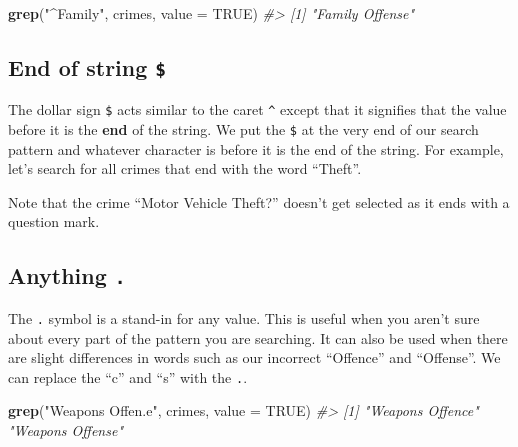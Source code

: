 \documentclass[
  12pt,
]{book}
\newenvironment{Shaded}{\begin{snugshade}}{\end{snugshade}}
\newcommand{\CommentTok}[1]{\textcolor[rgb]{0.37,0.37,0.37}{\textit{#1}}}
\newcommand{\DataTypeTok}[1]{\textcolor[rgb]{0.27,0.27,0.27}{#1}}
\newcommand{\KeywordTok}[1]{\textcolor[rgb]{0.27,0.27,0.27}{\textbf{#1}}}
\newcommand{\NormalTok}[1]{#1}
\newcommand{\OtherTok}[1]{\textcolor[rgb]{0.37,0.37,0.37}{#1}}
\newcommand{\StringTok}[1]{\textcolor[rgb]{0.5,0.5,0.5}{#1}}
\begin{document}
\begin{Shaded}
\begin{Highlighting}[]
\KeywordTok{grep}\NormalTok{(}\StringTok{"\^{}Family"}\NormalTok{, crimes, }\DataTypeTok{value =} \OtherTok{TRUE}\NormalTok{)}
\CommentTok{\#> [1] "Family Offense"}
\end{Highlighting}
\end{Shaded}

\hypertarget{end-of-string}{%
\subsection{\texorpdfstring{End of string \texttt{\$}}{End of string \$}}\label{end-of-string}}

The dollar sign \texttt{\$} acts similar to the caret \texttt{\^{}} except that it signifies that the value before it is the \textbf{end} of the string. We put the \texttt{\$} at the very end of our search pattern and whatever character is before it is the end of the string. For example, let's search for all crimes that end with the word ``Theft''.

\begin{Shaded}
\end{Shaded}

Note that the crime ``Motor Vehicle Theft?'' doesn't get selected as it ends with a question mark.

\hypertarget{anything-.}{%
\subsection{\texorpdfstring{Anything \texttt{.}}{Anything .}}\label{anything-.}}

The \texttt{.} symbol is a stand-in for any value. This is useful when you aren't sure about every part of the pattern you are searching. It can also be used when there are slight differences in words such as our incorrect ``Offence'' and ``Offense''. We can replace the ``c'' and ``s'' with the \texttt{.}.

\begin{Shaded}
\begin{Highlighting}[]
\KeywordTok{grep}\NormalTok{(}\StringTok{"Weapons Offen.e"}\NormalTok{, crimes, }\DataTypeTok{value =} \OtherTok{TRUE}\NormalTok{)}
\CommentTok{\#> [1] "Weapons Offence" "Weapons Offense"}
\end{Highlighting}
\end{Shaded}
\end{document}
